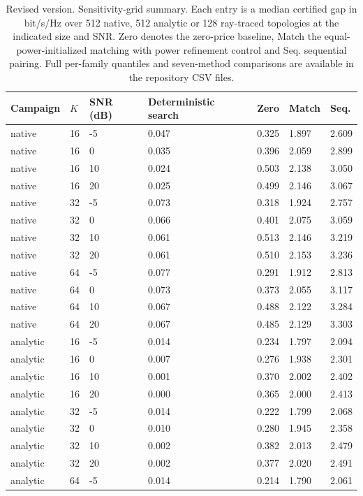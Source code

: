 \documentclass[10pt,letterpaper]{article}
\begin{document}
\begin{table}[p]\color{blue}\centering\small
\setlength{\tabcolsep}{3pt}
\caption{Revised version. Sensitivity-grid summary. Each entry is a median certified gap in bit/s/Hz over 512 native, 512 analytic or 128 ray-traced topologies at the indicated size and SNR. Zero denotes the zero-price baseline, Match the equal-power-initialized matching with power refinement control and Seq. sequential pairing. Full per-family quantiles and seven-method comparisons are available in the repository CSV files.}\label{supp:table5}
\begin{tabular}{lllllll}\toprule
Campaign & $K$ & SNR (dB) & Deterministic search & Zero & Match & Seq.\\\midrule
native & 16 & -5 & 0.047 & 0.325 & 1.897 & 2.609\\
native & 16 & 0 & 0.035 & 0.396 & 2.059 & 2.899\\
native & 16 & 10 & 0.024 & 0.503 & 2.138 & 3.050\\
native & 16 & 20 & 0.025 & 0.499 & 2.146 & 3.067\\
native & 32 & -5 & 0.073 & 0.318 & 1.924 & 2.757\\
native & 32 & 0 & 0.066 & 0.401 & 2.075 & 3.059\\
native & 32 & 10 & 0.061 & 0.513 & 2.146 & 3.219\\
native & 32 & 20 & 0.061 & 0.510 & 2.153 & 3.236\\
native & 64 & -5 & 0.077 & 0.291 & 1.912 & 2.813\\
native & 64 & 0 & 0.073 & 0.373 & 2.055 & 3.117\\
native & 64 & 10 & 0.067 & 0.488 & 2.122 & 3.284\\
native & 64 & 20 & 0.067 & 0.485 & 2.129 & 3.303\\
analytic & 16 & -5 & 0.014 & 0.234 & 1.797 & 2.094\\
analytic & 16 & 0 & 0.007 & 0.276 & 1.938 & 2.301\\
analytic & 16 & 10 & 0.001 & 0.370 & 2.002 & 2.402\\
analytic & 16 & 20 & 0.000 & 0.365 & 2.000 & 2.413\\
analytic & 32 & -5 & 0.014 & 0.222 & 1.799 & 2.068\\
analytic & 32 & 0 & 0.010 & 0.280 & 1.945 & 2.358\\
analytic & 32 & 10 & 0.002 & 0.382 & 2.013 & 2.479\\
analytic & 32 & 20 & 0.002 & 0.377 & 2.020 & 2.491\\
analytic & 64 & -5 & 0.014 & 0.214 & 1.790 & 2.061\\

\end{tabular}
\end{table}
\end{document}
